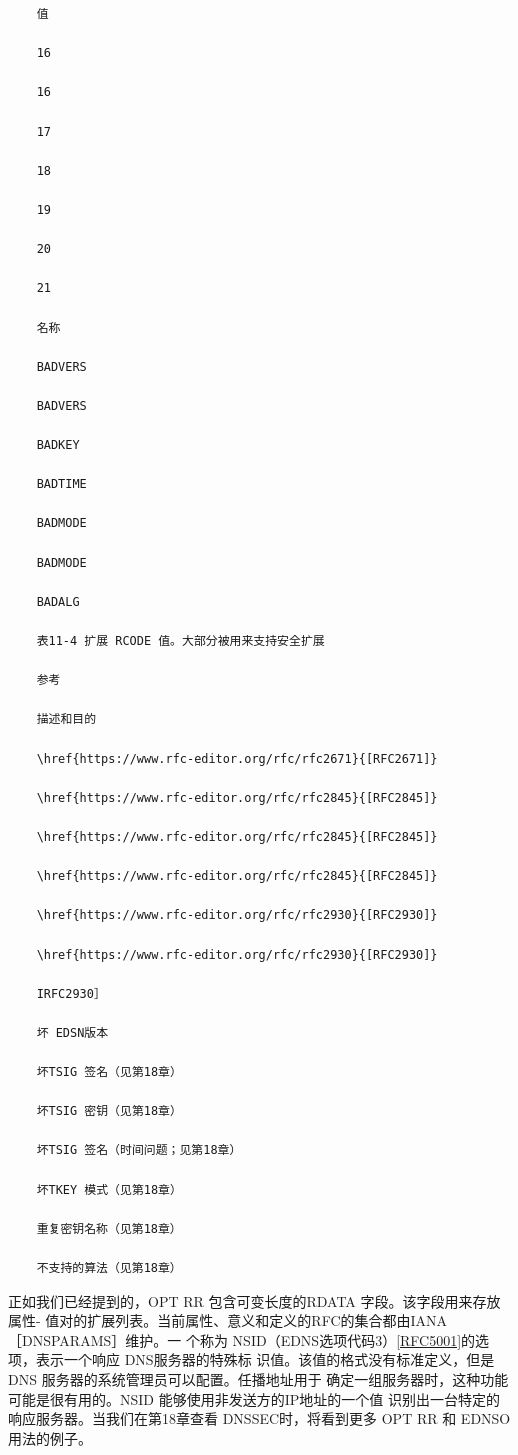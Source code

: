 \begin{verbatim}
    值

    16

    16

    17

    18

    19

    20

    21

    名称

    BADVERS

    BADVERS

    BADKEY

    BADTIME

    BADMODE

    BADMODE

    BADALG

    表11-4 扩展 RCODE 值。大部分被用来支持安全扩展

    参考

    描述和目的

    \href{https://www.rfc-editor.org/rfc/rfc2671}{[RFC2671]}

    \href{https://www.rfc-editor.org/rfc/rfc2845}{[RFC2845]}

    \href{https://www.rfc-editor.org/rfc/rfc2845}{[RFC2845]}

    \href{https://www.rfc-editor.org/rfc/rfc2845}{[RFC2845]}

    \href{https://www.rfc-editor.org/rfc/rfc2930}{[RFC2930]}

    \href{https://www.rfc-editor.org/rfc/rfc2930}{[RFC2930]}

    IRFC2930］

    坏 EDSN版本

    坏TSIG 签名（见第18章）

    坏TSIG 密钥（见第18章）

    坏TSIG 签名（时间问题；见第18章）

    坏TKEY 模式（见第18章）

    重复密钥名称（见第18章）

    不支持的算法（见第18章）
\end{verbatim}

正如我们已经提到的，OPT RR 包含可变长度的RDATA 字段。该字段用来存放属性-
值对的扩展列表。当前属性、意义和定义的RFC的集合都由IANA［DNSPARAMS］维护。一
个称为
NSID（EDNS选项代码3）\href{https://www.rfc-editor.org/rfc/rfc5001}{[RFC5001]}的选项，表示一个响应
DNS服务器的特殊标
识值。该值的格式没有标准定义，但是DNS 服务器的系统管理员可以配置。任播地址用于
确定一组服务器时，这种功能可能是很有用的。NSID 能够使用非发送方的IP地址的一个值
识别出一台特定的响应服务器。当我们在第18章查看 DNSSEC时，将看到更多 OPT RR 和
EDNSO用法的例子。

